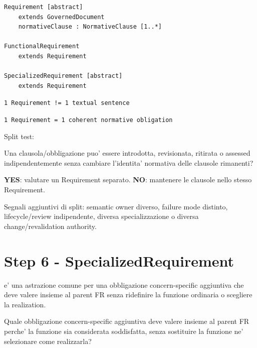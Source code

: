 \documentclass[11pt,a4paper]{article}
\begin{document}
\begin{lstlisting}
Requirement [abstract]
    extends GovernedDocument
    normativeClause : NormativeClause [1..*]

FunctionalRequirement
    extends Requirement

SpecializedRequirement [abstract]
    extends Requirement
\end{lstlisting}

\begin{ddtacore}
\texttt{1 Requirement != 1 textual sentence}\par
\texttt{1 Requirement  = 1 coherent normative obligation}
\end{ddtacore}

Split test:
\begin{ddtacheck}
Una clausola/obbligazione puo' essere introdotta, revisionata, ritirata o assessed indipendentemente senza cambiare l'identita' normativa delle clausole rimanenti?

\textbf{YES}: valutare un Requirement separato.\quad
\textbf{NO}: mantenere le clausole nello stesso Requirement.
\end{ddtacheck}

Segnali aggiuntivi di split: semantic owner diverso, failure mode distinto, lifecycle/review indipendente, diversa specializzazione o diversa change/revalidation authority.

\section{Step 6 - SpecializedRequirement}
\closedtag

\SR{} e' una astrazione comune per una obbligazione concern-specific aggiuntiva che deve valere insieme al parent FR senza ridefinire la funzione ordinaria o scegliere la realization.

\begin{ddtacheck}[title={Domanda fondamentale}]
Quale obbligazione concern-specific aggiuntiva deve valere insieme al parent FR perche' la funzione sia considerata soddisfatta, senza sostituire la funzione ne' selezionare come realizzarla?
\end{ddtacheck}
\end{document}
